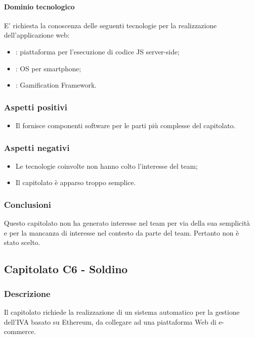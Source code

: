 			\paragraph{Dominio tecnologico} 
			E' richiesta la conoscenza delle seguenti tecnologie per la realizzazione dell'applicazione web:
				\begin{itemize}
					\item \textbf{}: piattaforma per l'esecuzione di codice JS server-side;
					\item \textbf{}: OS per smartphone;
					\item \textbf{}: Gamification Framework.
				\end{itemize}
		\subsubsection{Aspetti positivi}
		\begin{itemize}
			\item Il  fornisce componenti software per le parti più complesse del capitolato.
		\end{itemize}
		\subsubsection{Aspetti negativi}
		\begin{itemize}
			\item Le tecnologie coinvolte non hanno colto l'interesse del team;
			\item Il capitolato è apparso troppo semplice.
		\end{itemize}
		\subsubsection{Conclusioni}
		Questo capitolato non ha generato interesse nel team per via della sua semplicità e per la mancanza di interesse nel contesto da parte del team. Pertanto non è stato scelto.
		
		
	\subsection{Capitolato C6 - Soldino}
		\subsubsection{Descrizione}
		Il capitolato richiede la realizzazione di un sistema automatico per la gestione dell’IVA basato su Ethereum, da collegare ad una piattaforma Web di e-commerce.
